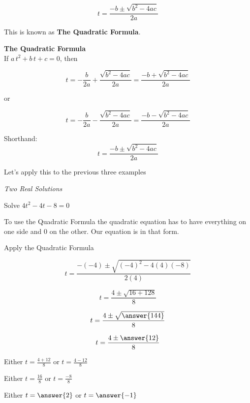 \documentclass{ximera}
\begin{document}
\[ t  =   \frac{-b \pm \sqrt{b^2 - 4 a c}}{2a}      \]


This is known as \textbf{The Quadratic Formula}.




\begin{definition} \textbf{\textcolor{green!50!black}{The Quadratic Formula}} \\



If $a \, t^2 + b \, t + c = 0$, then


\[ t   = - \frac{b}{2 a} + \frac{\sqrt{b^2 - 4 a c}}{2a}  = \frac{-b + \sqrt{b^2 - 4 a c}}{2a}      \]

or

\[ t  = - \frac{b}{2 a}  -\frac{\sqrt{b^2 - 4 a c}}{2a} =    \frac{-b - \sqrt{b^2 - 4 a c}}{2a}      \]



Shorthand: 
\[ t  =   \frac{-b \pm \sqrt{b^2 - 4 a c}}{2a}      \]


\end{definition}









Let's apply this to the previous three examples







\begin{example} \textit{Two Real Solutions} 

Solve $4 t^2 - 4 t - 8 = 0$ \\



\begin{explanation}

To use the Quadratic Formula the quadratic equation has to have everything on one side and $0$ on the other.  Our equation is in that form.

Apply the Quadratic Formula


\[   t = \frac{-(-4) \pm \sqrt{(-4)^2 - 4 (4) (-8)}}{2 (4)}            \]

\[   t = \frac{4 \pm \sqrt{16 + 128}}{8}            \]

\[   t = \frac{4 \pm \sqrt{\answer{144}}}{8}            \]

\[   t = \frac{4 \pm \answer{12}}{8}            \]




Either $t = \frac{4 + 12}{8} $ or $t = \frac{4 - 12}{8} $

Either $t = \frac{16}{8} $ or $t = \frac{-8}{8} $

Either $t = \answer{2}$ or $t = \answer{-1}$

\end{explanation}

\end{example}
\end{document}
